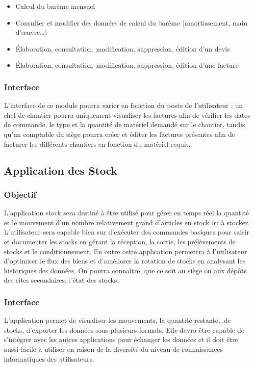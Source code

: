            \begin{itemize}
	        \item Calcul du barème mensuel
	        \item Consulter et modifier des données de calcul du barème (amortissement, main d'œuvre…)
	        \item Élaboration, consultation, modification, suppression, édition d'un devis
	        \item Élaboration, consultation, modification, suppression, édition d'une facture
           \end{itemize}

	    \subsubsection {Interface}
	    L'interface de ce module pourra varier en fonction du poste de l'utilisateur : un chef de chantier pourra uniquement visualiser les factures afin de vérifier les dates de commande, le type et la quantité de matériel demandé sur le chantier, tandis qu'un comptable du siège pourra créer et éditer les factures présentes afin de facturer les différents chantiers en fonction du matériel requis.

    \subsection{Application des Stock}
	    \subsubsection{Objectif}
	    L'application stock sera destiné à être utilisé pour gérer en temps réel la quantité et le mouvement d'un nombre relativement grand d'articles en stock ou à stocker. L'utilisateur sera capable bien sur d'exécuter des commandes basiques pour saisir et documenter les stocks en gérant la réception, la sortie, les prélèvements de stocks et le conditionnement. En outre cette application permettra à l'utilisateur d'optimiser le flux des biens et d'améliorer la rotation de stocks en analysant les historiques des données. On pourra connaître, que ce soit au siège ou aux dépôts des sites secondaires, l'état des stocks.

	    \subsubsection{Interface}
	    L'application permet de visualiser les mouvements, la quantité restante...de stocks, d'exporter les données sous plusieurs formats. Elle devra être capable de s'intégrer avec les autres applications pour échanger les données et il doit être aussi facile à utiliser en raison de la diversité du niveau de connaissances informatiques des utilisateurs.

